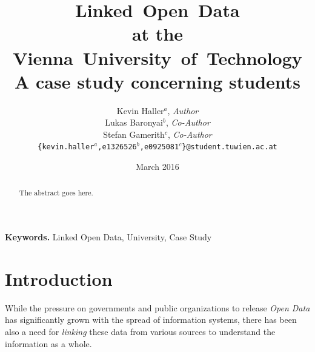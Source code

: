 \documentclass{article}
\begin{document}
\title{Linked~Open~Data\\
	   at the\\
	   Vienna~University~of~Technology\\
	   \large A case study concerning students}

\author{Kevin Haller$^a$, \textit{Author}\\
		Lukas Baronyai$^b$, \textit{Co-Author}\\
		Stefan Gamerith$^c$, \textit{Co-Author}\\
	\texttt{\{kevin.haller$^a$,e1326526$^b$,e0925081$^c$\}@student.tuwien.ac.at}}
\date{March 2016} 

\maketitle

\begin{abstract}
The abstract goes here.
\end{abstract}

\smallskip
\noindent \textbf{Keywords.} Linked Open Data, University, Case Study

\newpage


\tableofcontents

\newpage



\section{Introduction}
\label{introduction}
While the pressure on governments and public organizations to release \textit{Open Data} has significantly grown with the spread of information systems, there has been also a need for \textit{linking} these data from various sources to understand the information as a whole.
\end{document}
